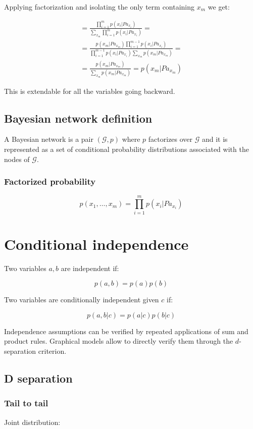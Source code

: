 		Applying factorization and isolating the only term containing $x_m$ we get:

		\begin{align*}
			=\frac{\prod\limits_{i=1}^mp(x_i|Pa_{x_i})}{\sum\limits_{x_m}\prod\limits_{i=1}^mp(x_i | Pa_{x_i})} =\\
			=\frac{p(x_m|Pa_{x_m})\prod\limits_{i=1}^{m-1}p(x_i | Pa_{x_i})}{\prod\limits_{i=1}^{m-1}p(x_i|Pa_{x_i})\sum\limits_{x_m}p(x_m|Pa_{x_m})}=\\
			=\frac{p(x_m|Pa_{x_m})}{\sum\limits_{x_m}p(x_m|Pa_{x_m})} = p(x_m|Pa_{x_m})
		\end{align*}

		This is extendable for all the variables going backward.

	\subsection{Bayesian network definition}
	A Bayesian network is a pair $(\mathcal{G}, p)$ where $p$ factorizes over $\mathcal{G}$ and it is represented as a set of conditional probability distributions associated with the nodes of $\mathcal{G}$.

		\subsubsection{Factorized probability}

		$$p(x_1, \dots, x_m) = \prod\limits_{i =1}^m p(x_i | Pa_{x_i})$$


\section{Conditional independence}
Two variables $a,b$ are independent if:

$$p(a,b) = p(a)p(b)$$

Two variables are conditionally independent given $c$ if:

$$p(a,b|c) = p(a|c)p(b|c)$$

Independence assumptions can be verified by repeated applications of sum and product rules.
Graphical models allow to directly verify them through the $d$-separation criterion.

	\subsection{D separation}

		\subsubsection{Tail to tail}
		Joint distribution:

